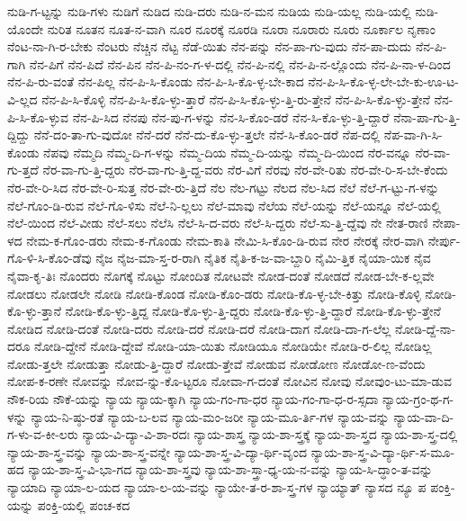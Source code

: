 {ನುಡಿ-ಗ-ಟ್ಟನ್ನು
ನುಡಿ-ಗಳು
ನುಡಿಗೆ
ನುಡಿದ
ನುಡಿ-ದರು
ನುಡಿ-ನ-ಮನ
ನುಡಿಯ
ನುಡಿ-ಯಲ್ಲ
ನುಡಿ-ಯಲ್ಲಿ
ನುಡಿ-ಯೊಂದೇ
ನುರಿತ
ನೂತನ
ನೂತ-ನ-ವಾಗಿ
ನೂರ
ನೂರಕ್ಕೆ
ನೂರಡಿ
ನೂರಾ
ನೂರಾರು
ನೂರು
ನೂರ್ಕಾಲ
ನೃಣಾಂ
ನೆಂಟ-ನಾ-ಗಿ-ರ-ಬೇಕು
ನೆಂಟರು
ನೆಚ್ಚಿನ
ನೆಟ್ಟ
ನೆಡೆ-ಯಿತು
ನೆನ-ಪನ್ನು
ನೆನ-ಪಾ-ಗು-ವುದು
ನೆನ-ಪಾ-ದುದು
ನೆನ-ಪಿ-ಗಾಗಿ
ನೆನ-ಪಿಗೆ
ನೆನ-ಪಿದೆ
ನೆನ-ಪಿನ
ನೆನ-ಪಿ-ನಂ-ಗ-ಳ-ದಲ್ಲಿ
ನೆನ-ಪಿ-ನಲ್ಲಿ
ನೆನ-ಪಿ-ನ-ಲ್ಲೊಂದು
ನೆನ-ಪಿ-ನಾ-ಳ-ದಿಂದ
ನೆನ-ಪಿ-ರು-ವಂತೆ
ನೆನ-ಪಿಲ್ಲ
ನೆನ-ಪಿ-ಸಿ-ಕೊಂಡು
ನೆನ-ಪಿ-ಸಿ-ಕೊ-ಳ್ಳ-ಬೇ-ಕಾದ
ನೆನ-ಪಿ-ಸಿ-ಕೊ-ಳ್ಳ-ಲೇ-ಬೇ-ಕು-ಊ-ಟ-ವಿ-ಲ್ಲದ
ನೆನ-ಪಿ-ಸಿ-ಕೊಳ್ಳಿ
ನೆನ-ಪಿ-ಸಿ-ಕೊ-ಳ್ಳು-ತ್ತಾರೆ
ನೆನ-ಪಿ-ಸಿ-ಕೊ-ಳ್ಳು-ತ್ತಿ-ರು-ತ್ತೇನೆ
ನೆನ-ಪಿ-ಸಿ-ಕೊ-ಳ್ಳು-ತ್ತೇನೆ
ನೆನ-ಪಿ-ಸಿ-ಕೊ-ಳ್ಳುವ
ನೆನ-ಪಿ-ಸಿದ
ನೆನಪು
ನೆನ-ಪು-ಗ-ಳನ್ನು
ನೆನ-ಸಿ-ಕೊಂ-ಡರೆ
ನೆನ-ಸಿ-ಕೊ-ಳ್ಳು-ತ್ತಿ-ದ್ದಾರೆ
ನೆನಾ-ಪಾ-ಗು-ತ್ತಿ-ದ್ದಿದ್ದು
ನೆನೆ-ದಂ-ತಾ-ಗು-ವುದೋ
ನೆನೆ-ದರೆ
ನೆನೆ-ದು-ಕೊ-ಳ್ಳು-ತ್ತಲೇ
ನೆನೆ-ಸಿ-ಕೊಂ-ಡರೆ
ನೆಪ-ದಲ್ಲಿ
ನೆಪ-ವಾ-ಗಿ-ಸಿ-ಕೊಂಡು
ನೆಪವು
ನೆಮ್ಮದಿ
ನೆಮ್ಮ-ದಿ-ಗ-ಳನ್ನು
ನೆಮ್ಮ-ದಿಯ
ನೆಮ್ಮ-ದಿ-ಯನ್ನು
ನೆಮ್ಮ-ದಿ-ಯಿಂದ
ನೆರ-ವನ್ನೂ
ನೆರ-ವಾ-ಗು-ತ್ತದೆ
ನೆರ-ವಾ-ಗು-ತ್ತಿ-ದ್ದರು
ನೆರ-ವಾ-ಗು-ತ್ತಿ-ದ್ದ-ವರು
ನೆರ-ವಿಗೆ
ನೆರವು
ನೆರ-ವೇ-ರಿತು
ನೆರ-ವೇ-ರಿ-ಸ-ಬೇ-ಕೆಂದು
ನೆರ-ವೇ-ರಿ-ಸಿದ
ನೆರ-ವೇ-ರಿ-ಸುತ್ತ
ನೆರ-ವೇ-ರು-ತ್ತಿದೆ
ನೆಲ
ನೆಲ-ಗಟ್ಟು
ನೆಲದ
ನೆಲ-ಸಿದ
ನೆಲೆ
ನೆಲೆ-ಗ-ಟ್ಟು-ಗ-ಳನ್ನು
ನೆಲೆ-ಗೊಂ-ಡಿ-ರುವ
ನೆಲೆ-ಗೊ-ಳಿಸು
ನೆಲೆ-ನಿ-ಲ್ಲಲು
ನೆಲೆ-ಮಾವು
ನೆಲೆಯ
ನೆಲೆ-ಯನ್ನು
ನೆಲೆ-ಯನ್ನೂ
ನೆಲೆ-ಯಲ್ಲಿ
ನೆಲೆ-ಯಿಂದ
ನೆಲೆ-ವೀಡು
ನೆಲೆ-ಸಲು
ನೆಲೆಸಿ
ನೆಲೆ-ಸಿ-ದ-ವರು
ನೆಲೆ-ಸಿ-ದ್ದರು
ನೆಲೆ-ಸು-ತ್ತಿ-ದ್ದೆವು
ನೇ
ನೇತ-ರಾಣಿ
ನೇಪಾ-ಳದ
ನೇಮ-ಕ-ಗೊಂ-ಡರು
ನೇಮ-ಕ-ಗೊಂಡು
ನೇಮ-ಕಾತಿ
ನೇಮಿ-ಸಿ-ಕೊಂ-ಡಿ-ರುವ
ನೇರ
ನೇರಕ್ಕೆ
ನೇರ-ವಾಗಿ
ನೇರ್ಪು-ಗೊ-ಳಿ-ಸಿ-ಕೊಂ-ಡೆವು
ನೈಜ
ನೈಜ-ಮಾ-ಸ್ತ-ರ-ರಾಗಿ
ನೈತಿಕ
ನೈತಿ-ಕ-ಜ-ವಾ-ಬ್ದಾರಿ
ನೈಮಿ-ತ್ತಿಕ
ನೈಯಾ-ಯಿಕ
ನೈವ
ನೈವಾ-ಕೃ-ತಿಃ
ನೊಂದರು
ನೊಗಕ್ಕೆ
ನೊಟ್ಟು
ನೋಂದಿತ
ನೋಟವೇ
ನೋಡ-ದಂತೆ
ನೋಡದೆ
ನೋಡ-ಬೇ-ಕ-ಲ್ಲವೇ
ನೋಡಲು
ನೋಡಲೇ
ನೋಡಿ
ನೋಡಿ-ಕೊಂಡ
ನೋಡಿ-ಕೊಂ-ಡರು
ನೋಡಿ-ಕೊ-ಳ್ಳ-ಬೇ-ಕಿತ್ತು
ನೋಡಿ-ಕೊಳ್ಳಿ
ನೋಡಿ-ಕೊ-ಳ್ಳು-ತ್ತಾನೆ
ನೋಡಿ-ಕೊ-ಳ್ಳು-ತ್ತಿದ್ದ
ನೋಡಿ-ಕೊ-ಳ್ಳು-ತ್ತಿ-ದ್ದರು
ನೋಡಿ-ಕೊ-ಳ್ಳು-ತ್ತಿ-ದ್ದಾರೆ
ನೋಡಿ-ಕೊ-ಳ್ಳು-ತ್ತೇನೆ
ನೋಡಿದ
ನೋಡಿ-ದಂತೆ
ನೋಡಿ-ದರು
ನೋಡಿ-ದರೆ
ನೋಡಿ-ದರೆ
ನೋಡಿ-ದಾಗ
ನೋಡಿ-ದಾ-ಗ-ಲೆಲ್ಲ
ನೋಡಿ-ದ್ದೆ-ನಾ-ದರೂ
ನೋಡಿ-ದ್ದೇನೆ
ನೋಡಿ-ದ್ದೇವೆ
ನೋಡಿ-ಯಾ-ಯಿತು
ನೋಡಿಯೂ
ನೋಡಿಯೇ
ನೋಡಿ-ರ-ಲಿಲ್ಲ
ನೋಡಿಲ್ಲ
ನೋಡು-ತ್ತಲೇ
ನೋಡುತ್ತಾ
ನೋಡು-ತ್ತಿ-ದ್ದಾರೆ
ನೋಡು-ತ್ತೇವೆ
ನೋಡುವ
ನೋಡೋಣ
ನೋಡೋ-ಣ-ವೆಂದು
ನೋಪ-ಕ-ರಣೇ
ನೋವನ್ನು
ನೋವ-ನ್ನು-ಕೊ-ಟ್ಟರೂ
ನೋವಾ-ಗ-ದಂತೆ
ನೋವಿನ
ನೋವು
ನೋವುಂ-ಟು-ಮಾ-ಡುವ
ನೌಕ-ರಿಯ
ನೌಕೆ-ಯನ್ನು
ನ್ಯಾಯ
ನ್ಯಾಯ-ಕ್ಕಾಗಿ
ನ್ಯಾಯ-ಗಂ-ಗಾ-ಧರ
ನ್ಯಾಯ-ಗಂ-ಗಾ-ಧ-ರ-ಸ್ಸದಾ
ನ್ಯಾಯ-ಗ್ರಂ-ಥ-ಗ-ಳನ್ನು
ನ್ಯಾಯ-ನಿ-ಷ್ಠು-ರತೆ
ನ್ಯಾಯ-ಬ-ಲವ
ನ್ಯಾಯ-ಮಂ-ಜರೀ
ನ್ಯಾಯ-ಮೂ-ರ್ತಿ-ಗಳ
ನ್ಯಾಯ-ವನ್ನು
ನ್ಯಾಯ-ವಾ-ದಿ-ಗ-ಳು-ವ-ಕೀ-ಲರು
ನ್ಯಾಯ-ವಿ-ದ್ಯಾ-ವಿ-ಶಾ-ರದಃ
ನ್ಯಾಯ-ಶಾಸ್ತ್ರ
ನ್ಯಾಯ-ಶಾ-ಸ್ತ್ರಕ್ಕೆ
ನ್ಯಾಯ-ಶಾ-ಸ್ತ್ರದ
ನ್ಯಾಯ-ಶಾ-ಸ್ತ್ರ-ದಲ್ಲಿ
ನ್ಯಾಯ-ಶಾ-ಸ್ತ್ರ-ವನ್ನು
ನ್ಯಾಯ-ಶಾ-ಸ್ತ್ರ-ವನ್ನೇ
ನ್ಯಾಯ-ಶಾ-ಸ್ತ್ರ-ವಿ-ದ್ಯಾ-ರ್ಥಿ-ವೃಂದ
ನ್ಯಾಯ-ಶಾ-ಸ್ತ್ರ-ವಿ-ದ್ಯಾ-ರ್ಥಿ-ಸ-ಮೂ-ಹದ
ನ್ಯಾಯ-ಶಾ-ಸ್ತ್ರ-ವಿ-ಭಾ-ಗದ
ನ್ಯಾಯ-ಶಾ-ಸ್ತ್ರವು
ನ್ಯಾಯ-ಶಾ-ಸ್ತ್ರಾ-ಧ್ಯ-ಯ-ನ-ವನ್ನು
ನ್ಯಾಯ-ಸಿ-ದ್ಧಾಂ-ತ-ವನ್ನು
ನ್ಯಾಯಾದಿ
ನ್ಯಾಯಾ-ಲ-ಯದ
ನ್ಯಾಯಾ-ಲ-ಯ-ವನ್ನು
ನ್ಯಾಯೇ-ತ-ರ-ಶಾ-ಸ್ತ್ರ-ಗಳ
ನ್ಯಾಯ್ಯಾತ್
ನ್ಯಾಸದ
ನ್ಯೂ
ಪ
ಪಂಕ್ತಿ-ಯನ್ನು
ಪಂಕ್ತಿ-ಯಲ್ಲಿ
ಪಂಚ-ಕದ
}
